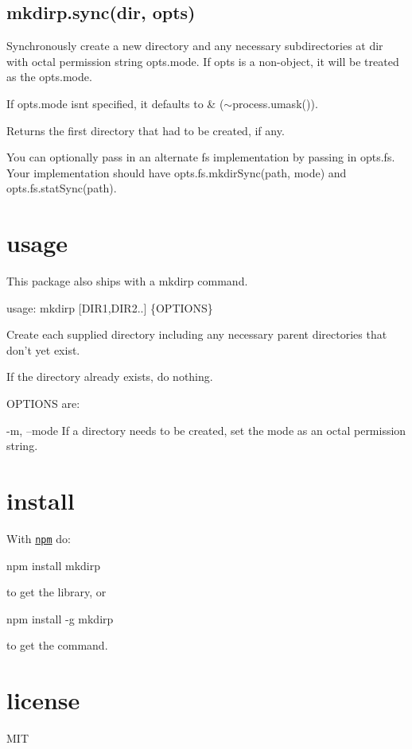\subsection*{mkdirp.\+sync(dir, opts)}

Synchronously create a new directory and any necessary subdirectories at {\ttfamily dir} with octal permission string {\ttfamily opts.\+mode}. If {\ttfamily opts} is a non-\/object, it will be treated as the {\ttfamily opts.\+mode}.

If {\ttfamily opts.\+mode} isn\textquotesingle{}t specified, it defaults to { \& ($\sim$process.umask())}.

Returns the first directory that had to be created, if any.

You can optionally pass in an alternate {\ttfamily fs} implementation by passing in {\ttfamily opts.\+fs}. Your implementation should have {\ttfamily opts.\+fs.\+mkdir\+Sync(path, mode)} and {\ttfamily opts.\+fs.\+stat\+Sync(path)}.

\section*{usage}

This package also ships with a {\ttfamily mkdirp} command.


\begin{DoxyCode}
usage: mkdirp [DIR1,DIR2..] \{OPTIONS\}

  Create each supplied directory including any necessary parent directories that
  don't yet exist.

  If the directory already exists, do nothing.

OPTIONS are:

  -m, --mode   If a directory needs to be created, set the mode as an octal
               permission string.
\end{DoxyCode}


\section*{install}

With \href{http://npmjs.org}{\tt npm} do\+:


\begin{DoxyCode}
npm install mkdirp
\end{DoxyCode}


to get the library, or


\begin{DoxyCode}
npm install -g mkdirp
\end{DoxyCode}


to get the command.

\section*{license}

M\+IT 